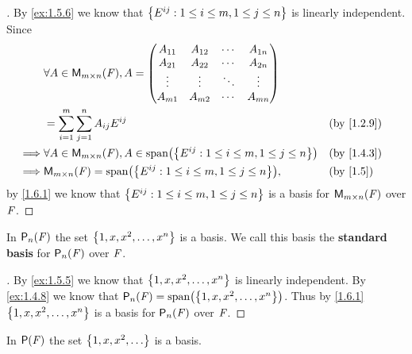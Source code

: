 \begin{proof}[]
  By \cref{ex:1.5.6} we know that \(\left\lbrace E^{i j} : 1 \leq i \leq m, 1 \leq j \leq n\right\rbrace\) is linearly independent.
  Since
  \begin{align*}
             & \forall A \in \MS, A = \begin{pmatrix}
                                        A_{1 1} & A_{1 2} & \cdots & A_{1 n} \\
                                        A_{2 1} & A_{2 2} & \cdots & A_{2 n} \\
                                        \vdots  & \vdots  & \ddots & \vdots  \\
                                        A_{m 1} & A_{m 2} & \cdots & A_{m n}
                                      \end{pmatrix}                                                   \\
             & = \sum_{i = 1}^m \sum_{j = 1}^n A_{i j} E^{i j}                                 &  & \text{(by \cref{1.2.9})} \\
    \implies & \forall A \in \MS, A \in \spn{\set{E^{i j} : 1 \leq i \leq m, 1 \leq j \leq n}} &  & \text{(by \cref{1.4.3})} \\
    \implies & \MS = \spn{\set{E^{i j} : 1 \leq i \leq m, 1 \leq j \leq n}},                   &  & \text{(by \cref{1.5})}
  \end{align*}
  by \cref{1.6.1} we know that \(\left\lbrace E^{i j} : 1 \leq i \leq m, 1 \leq j \leq n\right\rbrace\) is a basis for \(\mathsf{M}_{{m} \times n}({\mathit{F}})\) over \(\mathit{F}\).
\end{proof}

\begin{eg}\label{1.6.5}
  In \(\ps[n]{\F}\) the set \(\left\lbrace1, x, x^2, \dots, x^n\right\rbrace\) is a basis.
  We call this basis the \textbf{standard basis} for \(\ps[n]{\F}\) over \(\mathit{F}\).
\end{eg}

\begin{proof}[]
  By \cref{ex:1.5.5} we know that \(\left\lbrace1, x, x^2, \dots, x^n\right\rbrace\) is linearly independent.
  By \cref{ex:1.4.8} we know that \(\ps[n]{\F} = \spn{\set{1, x, x^2, \dots, x^n}}\).
  Thus by \cref{1.6.1} \(\left\lbrace1, x, x^2, \dots, x^n\right\rbrace\) is a basis for \(\ps[n]{\F}\) over \(\mathit{F}\).
\end{proof}

\begin{eg}\label{1.6.6}
  In \(\ps{\F}\) the set \(\set{1, x, x^2, \dots}\) is a basis.
\end{eg}

